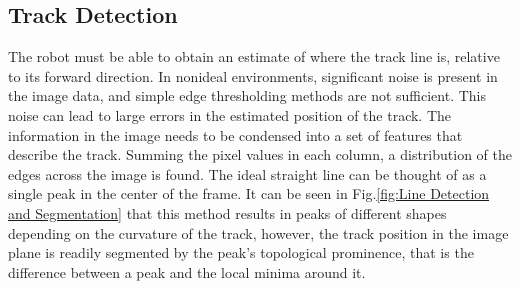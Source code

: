         \subsection{Track Detection}
        The robot must be able to obtain an estimate of where the track line is, relative to its forward direction.
        In nonideal environments, significant noise is present in the image data, 
        and simple edge thresholding methods are not sufficient. This noise can lead to large errors
        in the estimated position of the track. The information in the image needs to be condensed into a set of features
        that describe the track. Summing the pixel values in each column, a distribution of the edges 
        across the image is found. The ideal straight line can be thought of as a single peak in the center of the frame.  
        It can be seen in Fig.\ref{fig:Line Detection and Segmentation} that this method results in peaks of different 
        shapes depending on the curvature of the track, however, the track position in the image plane is readily 
        segmented by the peak's topological prominence, that is the difference between 
        a peak and the local minima around it. 
